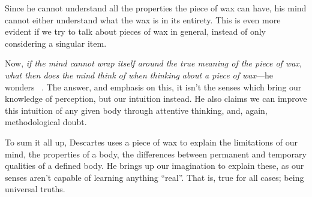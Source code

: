 \documentclass{myassignment}
\begin{document}
\begin{answer}
Since he cannot understand all the properties the piece of wax can have, his mind cannot either understand what the wax is in its entirety. This is even more evident if we try to talk about pieces of wax in general, instead of only considering a singular item.

\pagebreak
Now, \emph{if the mind cannot wrap itself around the true meaning of the piece of wax, what then does the mind think of when thinking about a piece of wax}---he wonders~\autocite{unipaper}
. The answer, and emphasis on this, it isn’t the senses which bring our knowledge of perception, but our intuition instead. He also claims we can improve this intuition of any given body through attentive thinking, and, again, methodological doubt.

To sum it all up, Descartes uses a piece of wax to explain the limitations of our mind, the properties of a body, the differences between permanent and temporary qualities of a defined body. He brings up our imagination to explain these, as our senses aren’t capable of learning anything “real”. That is, true for all cases; being universal truths.
\end{answer}

\vspace*{10ex}
\printbibliography
\end{document}
